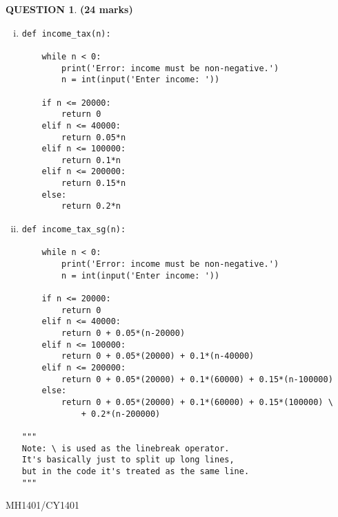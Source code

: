 \documentclass[a4paper,12pt]{article}
\theoremstyle{definition}
\newtheorem{ques}[dummy]{QUESTION}
\theoremstyle{plain}
\newcommand{\py}{python}
\begin{document}
	
	\begin{ques}\hfill\textbf{(24 marks)}\\
		\begin{enumerate}[(i)]
			\item 
			\begin{verbatim}
def income_tax(n):

    while n < 0:
        print('Error: income must be non-negative.')
        n = int(input('Enter income: '))
    
    if n <= 20000:
        return 0
    elif n <= 40000:
        return 0.05*n
    elif n <= 100000:
        return 0.1*n
    elif n <= 200000:
        return 0.15*n
    else:
        return 0.2*n
			\end{verbatim}
			\item
			\begin{verbatim}
def income_tax_sg(n):

    while n < 0:
        print('Error: income must be non-negative.')
        n = int(input('Enter income: '))
    
    if n <= 20000:
        return 0
    elif n <= 40000:
        return 0 + 0.05*(n-20000)
    elif n <= 100000:
        return 0 + 0.05*(20000) + 0.1*(n-40000)
    elif n <= 200000:
        return 0 + 0.05*(20000) + 0.1*(60000) + 0.15*(n-100000)
    else:
        return 0 + 0.05*(20000) + 0.1*(60000) + 0.15*(100000) \
            + 0.2*(n-200000)

"""
Note: \ is used as the linebreak operator.
It's basically just to split up long lines,
but in the code it's treated as the same line.
"""
			\end{verbatim}
		\end{enumerate}
	\end{ques}
	
	\newpage
	\hfill MH1401/CY1401\vspace*{0.5em}
	
\end{document}
